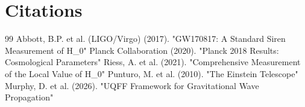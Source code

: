 \documentclass[12pt,a4paper]{article}
\begin{document}
\section*{Citations}
\begin{thebibliography}{99}
 Abbott, B.P. et al. (LIGO/Virgo) (2017). "GW170817: A Standard Siren Measurement of H\_0"
 Planck Collaboration (2020). "Planck 2018 Results: Cosmological Parameters"
 Riess, A. et al. (2021). "Comprehensive Measurement of the Local Value of H\_0"
 Punturo, M. et al. (2010). "The Einstein Telescope"
 Murphy, D. et al. (2026). "UQFF Framework for Gravitational Wave Propagation"
\end{thebibliography}

\end{document}
